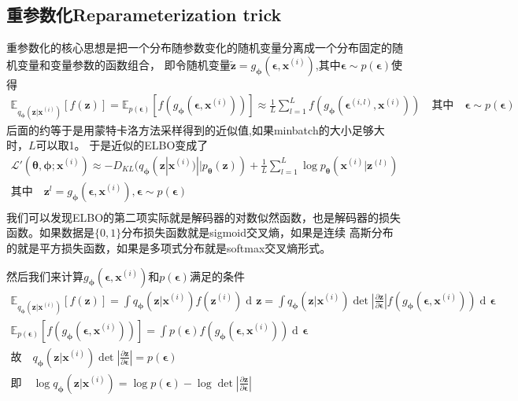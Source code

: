 \documentclass[UTF8]{ctexart}
\DeclareMathOperator\dif{d\!}
\newcommand*{\bb}[1]{\mathbf{#1}}
\begin{document}
\subsection{重参数化Reparameterization trick}
重参数化的核心思想是把一个分布随参数变化的随机变量分离成一个分布固定的随机变量和变量参数的函数组合，
即令随机变量$\tilde{\bb z}=g_{\bm \phi}(\bm\epsilon,\bb x^{(i)})$,其中$\bm\epsilon \sim p(\bb \epsilon)$使得
\begin{gather*}
  \mathbb{E}_{q_{\bm\phi}(\bb z|\bb x^{(i)})}\left[ f(\bb z) \right] = \mathbb{E}_{p(\bm \epsilon)}\left[ f(g_{\bm \phi}(\bm\epsilon,\bb x^{(i)})) \right]\approx \frac 1L\sum^L_{l=1} f(g_{\bm \phi}(\bm\epsilon^{(i,l)},\bb x^{(i)})) 
  \quad\text{其中}\quad\bm\epsilon \sim p(\bm \epsilon)
\end{gather*}
后面的约等于是用蒙特卡洛方法采样得到的近似值,如果minbatch的大小足够大时，$L$可以取1。
于是近似的ELBO变成了
\begin{gather*}
  \mathcal{L}'(\bm \theta,\bm \phi;\bb x^{(i)})\approx-D_{KL}(q_{\bm\phi}(\bb z| \bb x^{(i)})||p_{\bm\theta}(\bb z)) + \frac 1L\sum^L_{l=1} \log p_{\bm\theta}(\bb x^{(i)}|\bb z^{(l)})\\  
  \text{其中}\quad \bb z^{l}=g_{\bm \phi}(\bm\epsilon,\bb x^{(i)}) ,\bm\epsilon \sim p(\bm \epsilon)\\
\end{gather*}
我们可以发现ELBO的第二项实际就是解码器的对数似然函数，也是解码器的损失函数。如果数据是$\{0,1\}$分布损失函数就是sigmoid交叉熵，如果是连续
高斯分布的就是平方损失函数，如果是多项式分布就是softmax交叉熵形式。

然后我们来计算$g_{\bm \phi}(\bm\epsilon,\bb x^{(i)})$和$p(\bb \epsilon)$满足的条件
\begin{gather*}
  \mathbb{E}_{q_{\bm\phi}(\bb z|\bb x^{(i)})}\left[ f(\bb z) \right] = \int q_{\bm\phi}(\bb z|\bb x^{(i)})f(\bb z^{(i)})\dif \bb z=\int q_{\bm\phi}(\bb z|\bb x^{(i)})\det\left|{\frac{\partial \bb z}{\partial \bm\epsilon}}\right|f(g_{\bm \phi}(\bm\epsilon,\bb x^{(i)}))\dif \bm\epsilon\\
  \mathbb{E}_{p(\bm \epsilon)}\left[ f(g_{\bm \phi}(\bm\epsilon,\bb x^{(i)})) \right]=\int p(\bm \epsilon)f(g_{\bm \phi}(\bm\epsilon,\bb x^{(i)})) \dif \bm \epsilon\\
  \text{故}\quad q_{\bm\phi}(\bb z|\bb x^{(i)})\det\left|{\frac{\partial \bb z}{\partial \bm\epsilon}}\right|=p(\bm \epsilon)\\
  \text{即}\quad \log q_{\bm\phi}(\bb z|\bb x^{(i)}) = \log p(\bm \epsilon) -\log \det\left|{\frac{\partial \bb z}{\partial \bm\epsilon}}\right|\\
\end{gather*}
\end{document}
